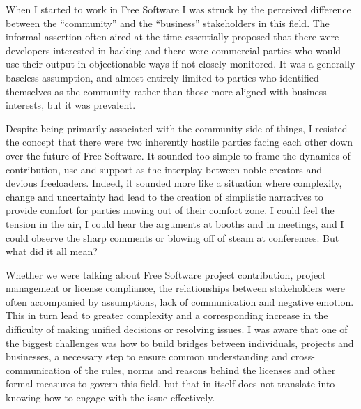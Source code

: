 

\noindent{}When I started to work in Free Software I was struck by the perceived
difference between the ``community'' and the ``business'' stakeholders in this field.
The informal assertion often aired at the time essentially proposed that there were
developers interested in hacking and there were commercial parties who would use
their output in objectionable ways if not closely monitored. It was a generally
baseless assumption, and almost entirely limited to parties who identified
themselves as the community rather than those more aligned with business
interests, but it was prevalent.

Despite being primarily associated with the community side of things, I resisted
the concept that there were two inherently hostile parties facing each other
down over the future of Free Software. It sounded too simple to frame the
dynamics of contribution, use and support as the interplay between noble
creators and devious freeloaders. Indeed, it sounded more like a situation where
complexity, change and uncertainty had lead to the creation of simplistic
narratives to provide comfort for parties moving out of their comfort zone. I
could feel the tension in the air, I could hear the arguments at booths and in
meetings, and I could observe the sharp comments or blowing off of steam at
conferences. But what did it all mean?

Whether we were talking about Free Software project contribution, project
management or license compliance, the relationships between stakeholders were
often accompanied by assumptions, lack of communication and negative emotion.
This in turn lead to greater complexity and a corresponding increase in the
difficulty of making unified decisions or resolving issues. I was aware that one
of the biggest challenges was how to build bridges between individuals, projects
and businesses, a necessary step to ensure common understanding and
cross-communication of the rules, norms and reasons behind the licenses and
other formal measures to govern this field, but that in itself does not
translate into knowing how to engage with the issue effectively.

